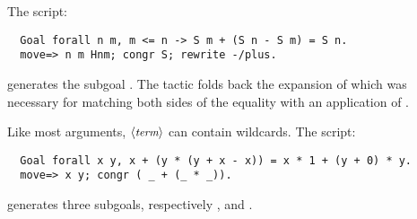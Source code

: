 The script:
\begin{lstlisting}
  Goal forall n m, m <= n -> S m + (S n - S m) = S n.
  move=> n m Hnm; congr S; rewrite -/plus.
\end{lstlisting}
generates the subgoal . The tactic
 folds back the expansion of  which was
necessary for matching both sides of the equality with an application
of .

Like most \ssr{} arguments, $\langle\mbox{\itshape\rmfamily\small term}\rangle$ can contain wildcards.
The script:
\begin{lstlisting}
  Goal forall x y, x + (y * (y + x - x)) = x * 1 + (y + 0) * y.
  move=> x y; congr ( _ + (_ * _)).
\end{lstlisting}
generates three subgoals, respectively , 
and .
